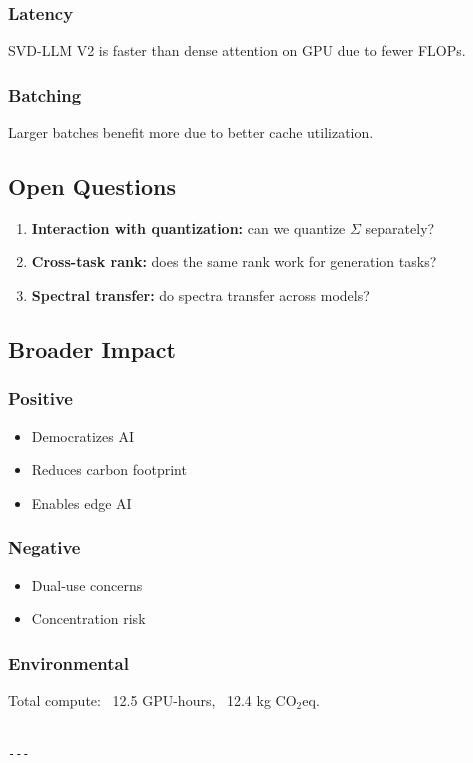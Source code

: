 \subsubsection{Latency}
SVD-LLM V2 is faster than dense attention on GPU due to fewer FLOPs.

\subsubsection{Batching}
Larger batches benefit more due to better cache utilization.

\subsection{Open Questions}

\begin{enumerate}
\item \textbf{Interaction with quantization:} can we quantize $\Sigma$ separately?
\item \textbf{Cross-task rank:} does the same rank work for generation tasks?
\item \textbf{Spectral transfer:} do spectra transfer across models?

\end{enumerate}
\subsection{Broader Impact}

\subsubsection{Positive}
\begin{itemize}
\item Democratizes AI
\item Reduces carbon footprint
\item Enables edge AI

\end{itemize}
\subsubsection{Negative}
\begin{itemize}
\item Dual-use concerns
\item Concentration risk

\end{itemize}
\subsubsection{Environmental}
Total compute: ~12.5 GPU-hours, ~12.4 kg CO$_2$eq.
\begin{lstlisting}

---
\end{lstlisting}


